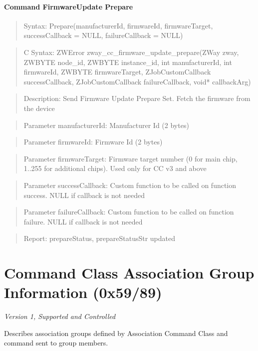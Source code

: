 \paragraph{Command FirmwareUpdate Prepare}
\begin{quote}Syntax: Prepare(manufacturerId, firmwareId, firmwareTarget, successCallback = NULL, failureCallback = NULL)\end{quote}
\begin{quote}C Syntax: ZWError zway\_cc\_firmware\_update\_prepare(ZWay zway, ZWBYTE node\_id, ZWBYTE instance\_id, int manufacturerId, int firmwareId, ZWBYTE firmwareTarget, ZJobCustomCallback successCallback, ZJobCustomCallback failureCallback, void* callbackArg)\end{quote}
\begin{quote}Description: Send Firmware Update Prepare Set. Fetch the firmware from the device\end{quote}
\begin{quote}Parameter manufacturerId: Manufacturer Id (2 bytes)\end{quote}
\begin{quote}Parameter firmwareId: Firmware Id (2 bytes)\end{quote}
\begin{quote}Parameter firmwareTarget: Firmware target number (0 for main chip, 1..255 for additional chips). Used only for CC v3 and above\end{quote}
\begin{quote}Parameter successCallback: Custom function to be called on function success. NULL if callback is not needed\end{quote}
\begin{quote}Parameter failureCallback: Custom function to be called on function failure. NULL if callback is not needed\end{quote}
\begin{quote}Report: prepareStatus, prepareStatusStr updated\end{quote}


\section{Command Class Association Group Information (0x59/89)}

\textit{Version 1, Supported and Controlled}
\newline

Describes association groups defined by Association Command Class and command sent to group members.
\newline

